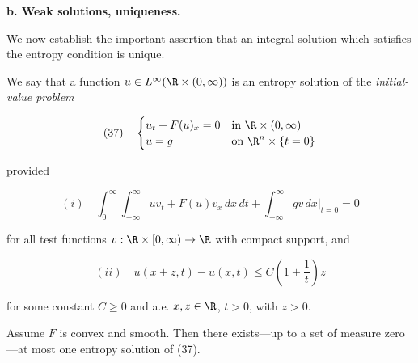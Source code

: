 \textbf{b. Weak solutions, uniqueness.}

We now establish the important assertion that an integral solution which satisfies the entropy condition is unique.

\begin{definition}
\label{def:entropy-solution-conservation-law}
We say that a function $u \in L^\infty(\R \times (0,\infty))$ is an entropy solution of the \textit{initial-value problem}

$$(37) \quad \begin{cases} u_t + F(u)_x = 0 & \text{in } \R \times (0,\infty) \\ u = g & \text{on } \R^n \times \{t = 0\} \end{cases}$$

provided

$$(i) \quad \int_0^\infty \int_{-\infty}^\infty uv_t + F(u)v_x \, dx \, dt + \int_{-\infty}^\infty gv \, dx \big|_{t=0} = 0$$

for all test functions $v : \R \times [0,\infty) \to \R$ with compact support, and

$$(ii) \quad u(x+z,t) - u(x,t) \leq C\left(1 + \frac{1}{t}\right)z$$

for some constant $C \geq 0$ and a.e. $x, z \in \R$, $t > 0$, with $z > 0$.
\end{definition}

\begin{theorem}
\label{thm:uniqueness-entropy-solutions}
Assume $F$ is convex and smooth. Then there exists—up to a set of measure zero—at most one entropy solution of (37).
\end{theorem}

